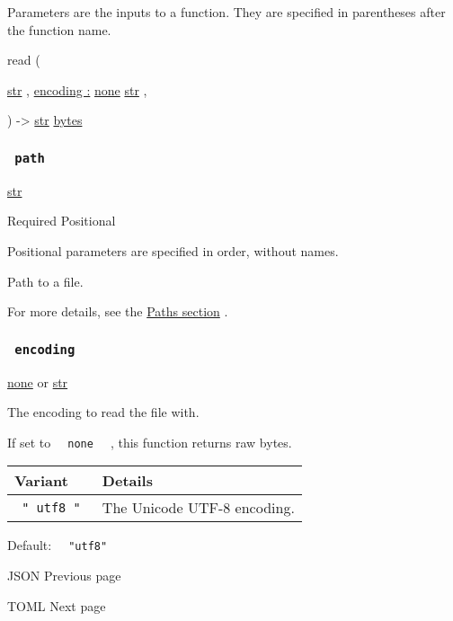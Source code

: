 \label{parameters-tooltip}
Parameters are the inputs to a function. They are specified in
parentheses after the function name.

{ read } (

{ \href{/docs/reference/foundations/str/}{str} , } {
\hyperref[parameters-encoding]{encoding :}
\href{/docs/reference/foundations/none/}{none}
\href{/docs/reference/foundations/str/}{str} , }

) -\textgreater{} \href{/docs/reference/foundations/str/}{str}
\href{/docs/reference/foundations/bytes/}{bytes}

\subsubsection{\texorpdfstring{\texttt{\ path\ }}{ path }}\label{parameters-path}

\href{/docs/reference/foundations/str/}{str}

{Required} {{ Positional }}

\label{parameters-path-positional-tooltip}
Positional parameters are specified in order, without names.

Path to a file.

For more details, see the \href{/docs/reference/syntax/\#paths}{Paths
section} .

\subsubsection{\texorpdfstring{\texttt{\ encoding\ }}{ encoding }}\label{parameters-encoding}

\href{/docs/reference/foundations/none/}{none} {or}
\href{/docs/reference/foundations/str/}{str}

The encoding to read the file with.

If set to \texttt{\ }{\texttt{\ none\ }}\texttt{\ } , this function
returns raw bytes.

\begin{longtable}[]{@{}ll@{}}
\toprule\noalign{}
Variant & Details \\
\midrule\noalign{}
\endhead
\bottomrule\noalign{}
\endlastfoot
\texttt{\ "\ utf8\ "\ } & The Unicode UTF-8 encoding. \\
\end{longtable}

Default: \texttt{\ }{\texttt{\ "utf8"\ }}\texttt{\ }

\href{/docs/reference/data-loading/json/}{\pandocbounded{}}

{ JSON } { Previous page }

\href{/docs/reference/data-loading/toml/}{\pandocbounded{}}

{ TOML } { Next page }
